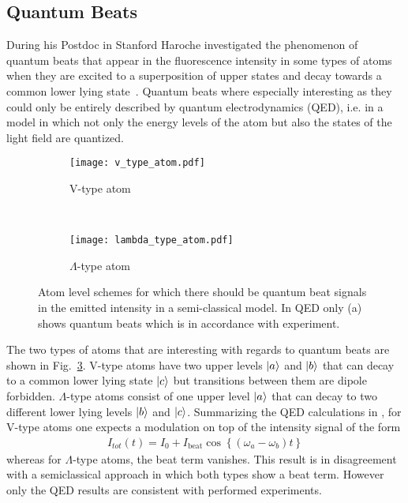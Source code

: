 \subsection{Quantum Beats}
\label{sec:QuantumBeats}
During his Postdoc in Stanford Haroche investigated the phenomenon of quantum
beats that appear in the fluorescence intensity in some types of atoms when they
are excited to a superposition of upper states and decay towards a common lower
lying state~\cite{haroche1973hyperfine}. Quantum beats where especially interesting as they could only be
entirely described by quantum electrodynamics (QED), i.e. in a model in which
not only the energy levels of the atom but also the states of the light field
are quantized.


\begin{figure}[t]
  \centering
  \begin{subfigure}[t]{0.4\linewidth}
    \texttt{[image: v\_type\_atom.pdf]}
    \caption{V-type atom}
    \label{fig:V_type}
  \end{subfigure}
  ~
  \begin{subfigure}[t]{0.4\linewidth}
    \centering
    \texttt{[image: lambda\_type\_atom.pdf]}
    \caption{$\Lambda$-type atom}
    \label{fig:lam_type}
  \end{subfigure}
  \caption{Atom level schemes for which there should be quantum beat signals in the
    emitted intensity in a semi-classical model. In QED only (a) shows quantum
beats which is in accordance with experiment.}
  \label{fig:atom_types}
\end{figure}

The two types of atoms that are interesting with regards to quantum beats are
shown in Fig.~\ref{fig:atom_types}. V-type atoms have two upper levels $\ket{a}$
and $\ket{b}$ that can decay to a common lower lying state $\ket{c}$ but
transitions between them are dipole forbidden. $\Lambda$-type atoms consist of
one upper level $\ket{a}$ that can decay to two different lower lying levels
$\ket{b}$ and $\ket{c}$. Summarizing the QED calculations in
\cite{scully1997QuantumBeats}, for V-type atoms one expects a modulation on top
of the intensity signal of the form
\begin{align}
  \label{eq:quantum_beat}
  I_{tot}(t) = I_0 + I_{\text{beat}} \cos\left\lbrace \left(\omega_a -
  \omega_b\right) t\right\rbrace
\end{align}
whereas for $\Lambda$-type atoms, the beat term vanishes. This result is in
disagreement with a semiclassical approach in which both types show a beat term.
However only the QED results are consistent with performed experiments.

